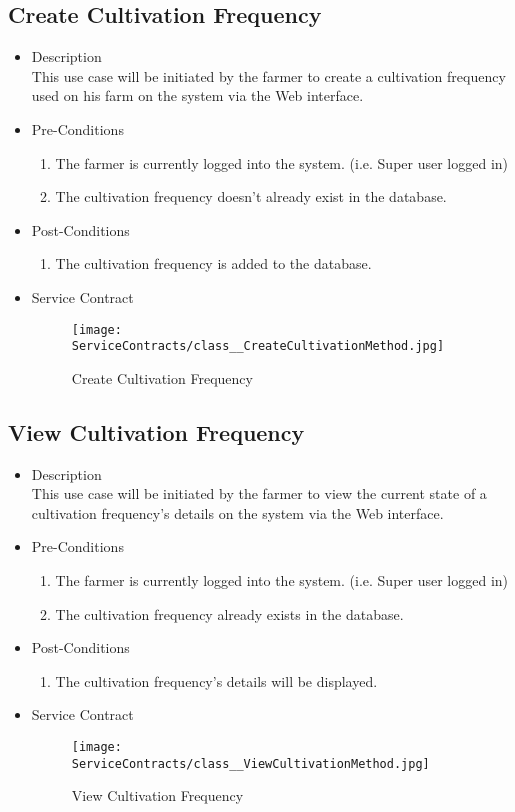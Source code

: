 \documentclass[11pt,fleqn]{book} %
\begin{document}
\subsection{Create Cultivation Frequency}
\begin{itemize}
	\item Description\\
	This use case will be initiated by the farmer to create a cultivation frequency used on his farm on the system via the Web interface.
	\item Pre-Conditions
	\begin{enumerate}
		\item The farmer is currently logged into the system. (i.e. Super user logged in)
		\item The cultivation frequency doesn’t already exist in the database. 				
	\end{enumerate}
	\item Post-Conditions
	\begin{enumerate}
		\item The cultivation frequency is added to the database.
	\end{enumerate}
	\item Service Contract
	\begin{figure}
		\texttt{[image: ServiceContracts/class\_\_CreateCultivationMethod.jpg]}
		\caption{Create Cultivation Frequency}
	\end{figure}
\end{itemize}

\subsection{View Cultivation Frequency}
\begin{itemize}
	\item Description\\
	This use case will be initiated by the farmer to view the current state of a cultivation frequency’s details on the system via the Web interface.
	\item Pre-Conditions
	\begin{enumerate}
		\item The farmer is currently logged into the system. (i.e. Super user logged in)
		\item The cultivation frequency already exists in the database.		
	\end{enumerate}
	\item Post-Conditions
	\begin{enumerate}
		\item The cultivation frequency’s details will be displayed.
	\end{enumerate}
	\item Service Contract
	\begin{figure}
		\texttt{[image: ServiceContracts/class\_\_ViewCultivationMethod.jpg]}
		\caption{View Cultivation Frequency}
	\end{figure}
\end{itemize}
\end{document}
